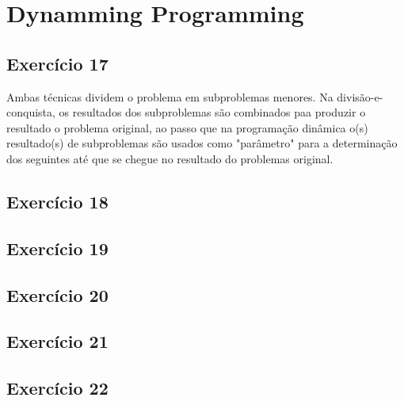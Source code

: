 \section{Dynamming Programming}\label{sec:dynamic_programming}

\subsection{Exercício 17}\label{sec:exer17}
Ambas técnicas dividem o problema em subproblemas menores. Na divisão-e-conquista,
os resultados dos subproblemas são combinados paa produzir o resultado o problema
original, ao passo que na programação dinâmica o(s) resultado(s) de subproblemas
são usados como "parâmetro" para a determinação dos seguintes até que se chegue
no resultado do problemas original.

\subsection{Exercício 18}\label{sec:exer18}



\subsection{Exercício 19}\label{sec:exer19}



\subsection{Exercício 20}\label{sec:exer20}



\subsection{Exercício 21}\label{sec:exer21}

\subsection{Exercício 22}\label{sec:exer22}
